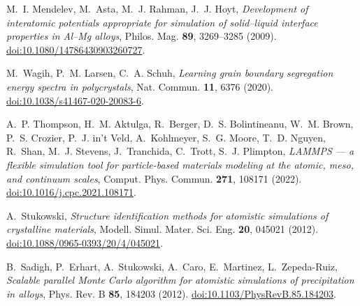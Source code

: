%
%
%
%

M.~I. Mendelev, M.~Asta, M.~J. Rahman, J.~J. Hoyt,
\emph{Development of interatomic potentials appropriate for simulation
of solid--liquid interface properties in Al--Mg alloys},
Philos. Mag. \textbf{89}, 3269--3285 (2009).
\href{https://doi.org/10.1080/14786430903260727}{doi:10.1080/14786430903260727}.

M.~Wagih, P.~M. Larsen, C.~A. Schuh,
\emph{Learning grain boundary segregation energy spectra in polycrystals},
Nat. Commun. \textbf{11}, 6376 (2020).
\href{https://doi.org/10.1038/s41467-020-20083-6}{doi:10.1038/s41467-020-20083-6}.

A.~P. Thompson, H.~M. Aktulga, R.~Berger, D.~S. Bolintineanu, W.~M. Brown,
P.~S. Crozier, P.~J. in't Veld, A.~Kohlmeyer, S.~G. Moore, T.~D. Nguyen,
R.~Shan, M.~J. Stevens, J.~Tranchida, C.~Trott, S.~J. Plimpton,
\emph{LAMMPS --- a flexible simulation tool for particle-based materials
modeling at the atomic, meso, and continuum scales},
Comput. Phys. Commun. \textbf{271}, 108171 (2022).
\href{https://doi.org/10.1016/j.cpc.2021.108171}{doi:10.1016/j.cpc.2021.108171}.

A.~Stukowski,
\emph{Structure identification methods for atomistic simulations of
crystalline materials},
Modell. Simul. Mater. Sci. Eng. \textbf{20}, 045021 (2012).
\href{https://doi.org/10.1088/0965-0393/20/4/045021}{doi:10.1088/0965-0393/20/4/045021}.

B.~Sadigh, P.~Erhart, A.~Stukowski, A.~Caro, E.~Martinez, L.~Zepeda-Ruiz,
\emph{Scalable parallel Monte Carlo algorithm for atomistic simulations
of precipitation in alloys},
Phys. Rev. B \textbf{85}, 184203 (2012).
\href{https://doi.org/10.1103/PhysRevB.85.184203}{doi:10.1103/PhysRevB.85.184203}.

